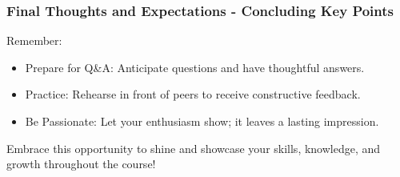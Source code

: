 \documentclass[aspectratio=169]{beamer}
\begin{document}
\begin{frame}[fragile]
    \frametitle{Final Thoughts and Expectations - Concluding Key Points}
    Remember:
    \begin{itemize}
        \item Prepare for Q\&A: Anticipate questions and have thoughtful answers.
        \item Practice: Rehearse in front of peers to receive constructive feedback.
        \item Be Passionate: Let your enthusiasm show; it leaves a lasting impression.
    \end{itemize}
    Embrace this opportunity to shine and showcase your skills, knowledge, and growth throughout the course!
\end{frame}
\end{document}
